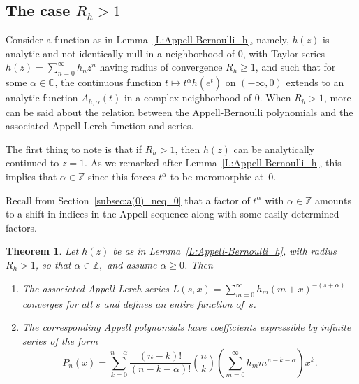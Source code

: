\documentclass[11pt,a4paper]{amsart}
\newcommand{\Z}{\mathbb{Z}}
\newcommand{\C}{\mathbb{C}}
\theoremstyle{plain}
\newtheorem{theorem}{Theorem}
\theoremstyle{plain}
\theoremstyle{definition}
\theoremstyle{remark}
\begin{document}
\subsection{The case $R_{h} > 1$}
\label{subsec:R>1}


Consider a function as in Lemma~\ref{L:Appell-Bernoulli_h}, namely, $h(z)$ is analytic and not identically null in a neighborhood of $0$, with Taylor series $h(z) = \sum_{n=0}^{\infty} h_{n} z^{n}$ having radius of convergence $R_{h} \geq 1$, and such that for some $\alpha \in \C$, the continuous function $t \mapsto t^{\alpha} h(e^{t})$ on $(-\infty,0)$ extends to an analytic function $A_{h,\alpha}(t)$ in a complex neighborhood of $0$. When $R_{h} > 1$, more can be said about the relation between the Appell-Bernoulli polynomials and the associated Appell-Lerch function and series.

The first thing to note is that if $R_{h} > 1$, then $h(z)$ can be analytically continued to $z=1$. As we remarked after Lemma~\ref{L:Appell-Bernoulli_h}, this implies that $\alpha \in \Z$ since this forces $t^{\alpha}$ to be meromorphic at~$0$.

Recall from Section~\ref{subsec:a(0)_neq_0} that a factor of $t^{\alpha}$ with $\alpha \in \Z$ amounts to a shift in indices in the Appell sequence along with some easily determined factors.


\begin{theorem}
\label{T:R>1_properties}
Let $h(z)$ be as in Lemma~\ref{L:Appell-Bernoulli_h}, with radius $R_{h} > 1$, so that $\alpha \in \Z, $ and assume $\alpha \geq 0$. Then 
\begin{enumerate}[label=\normalfont(\alph*)]
%
\item The associated Appell-Lerch series $L(s,x) = \sum_{m=0}^{\infty} h_{m} (m+x)^{-(s+\alpha)}$ converges for all $s$ and defines an entire function of~$s$.
%
\item The corresponding Appell polynomials have coefficients expressible by infinite series of the form
%
\begin{equation}
\label{E:polynomial_series_form}
	  P_{n}(x)
	= \sum_{k=0}^{n-\alpha} \frac{(n-k)!}{(n-k-\alpha)!} \binom{n}{k}
      \left( \sum_{m=0}^{\infty} h_{m} m^{n-k-\alpha} \right) x^{k}.
\end{equation}
%
\end{enumerate}
\end{theorem}
\end{document}
